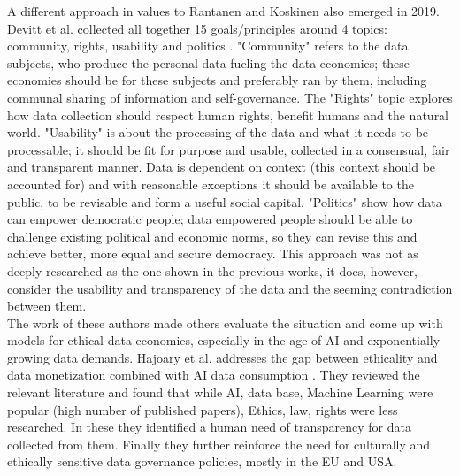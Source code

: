 \documentclass[english, 12pt, a4paper, sci, utf8, a-2b, online]{aaltothesis}
\theoremstyle{change}
\theoremstyle{theoremstyle}
\begin{document}
A different approach in values to Rantanen and Koskinen also emerged in 2019. Devitt et al. collected all together 15 goals/principles around 4 topics: community, rights, usability and politics \cite{devitt2019principles}. "Community" refers to the data subjects, who produce the personal data fueling the data economies; these economies should be for these subjects and preferably ran by them, including communal sharing of information and self-governance. The "Rights" topic explores how data collection should respect human rights, benefit humans and the natural world. "Usability" is about the processing of the data and what it needs to be processable; it should be fit for purpose and usable, collected in a consensual, fair and transparent manner. Data is dependent on context (this context should be accounted for) and with reasonable exceptions it should be available to the public, to be revisable and form a useful social capital. "Politics" show how data can empower democratic people; data empowered people should be able to challenge existing political and economic norms, so they can revise this and achieve better, more equal and secure democracy. This approach was not as deeply researched as the one shown in the previous works, it does, however, consider the usability and transparency of the data and the seeming contradiction between them.\\

The work of these authors made others evaluate the situation and come up with models for ethical data economies, especially in the age of AI and exponentially growing data demands. 
Hajoary et al. addresses the gap between ethicality and data monetization combined with AI data consumption \cite{hajoary2023exploring}. They reviewed the relevant literature and found that while AI, data base, Machine Learning were popular (high number of published papers), Ethics, law, rights were less researched. In these they identified a human need of transparency for data collected from them. Finally they further reinforce the need for culturally and ethically sensitive data governance policies, mostly in the EU and USA.\\
\end{document}
